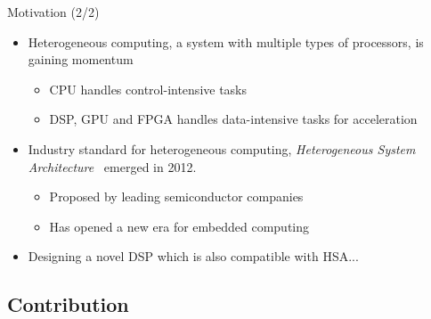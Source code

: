\documentclass{beamer}
\begin{document}
\begin{CJK}{UTF8}{bkai}
    \begin{frame}{Motivation (2/2)}
        \begin{itemize}
            \item <2->{
                    Heterogeneous computing, a system with multiple types of processors, is gaining momentum
                    \begin{itemize}
                        \item {
                                CPU handles control-intensive tasks
                            }
                        \item {
                                DSP, GPU and FPGA handles data-intensive tasks for acceleration
                            }
                    \end{itemize}
                }
            \item <3->{
                    Industry standard for heterogeneous computing, \textit{Heterogeneous System Architecture}~\cite{systemspec} emerged in 2012.
                    \begin{itemize}
                        \item {
                                Proposed by leading semiconductor companies%
                            }
                        \item {
                                Has opened a new era for embedded computing %
                            }
                    \end{itemize}
                }
            \item <4->{
                    Designing a novel DSP which is also compatible with HSA...
                }
        \end{itemize}
        \vspace{1em}
        \centering
    \end{frame}


    \subsection{Contribution}


\end{CJK}
\end{document}
